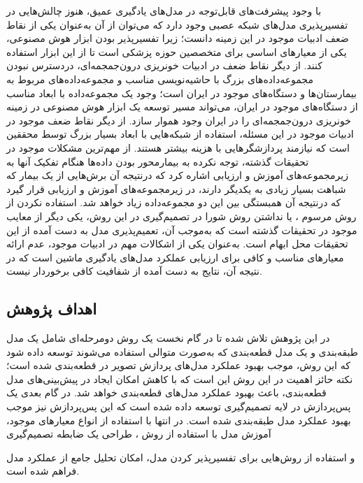  
 
 
 با وجود پیشرفت‌های قابل‌توجه در مدل‌های یادگیری عمیق، هنوز چالش‌هایی در تفسیرپذیری مدل‌های شبکه عصبی وجود دارد که می‌توان از آن به‌عنوان یکی از نقاط ضعف ادبیات موجود در این زمینه دانست؛ زیرا تفسیرپذیر بودن ابزار هوش مصنوعی، یکی از معیارهای اساسی برای متخصصین حوزه پزشکی است تا از این ابزار استفاده کنند. از دیگر نقاط ضعف در ادبیات خونریزی درون‌جمجمه‌ای، دردسترس نبودن مجموعه‌داده‌های بزرگ با حاشیه‌نویسی مناسب و مجموعه‌داده‌های مربوط به بیمارستان‌ها و دستگاه‌های موجود در ایران است؛ وجود یک مجموعه‌داده با ابعاد مناسب از دستگاه‌های موجود در ایران، می‌تواند مسیر توسعه یک ابزار هوش مصنوعی در زمینه خونریزی درون‌جمجمه‌ای را در ایران وجود هموار سازد. از دیگر نقاط ضعف موجود در ادبیات موجود در این مسئله، استفاده از شبکه‌هایی با ابعاد بسیار بزرگ توسط محققین است که نیازمند پردازشگر‌هایی با هزینه بیشتر هستند. از مهم‌ترین مشکلات موجود در تحقیقات گذشته، توجه نکرده به بیمارمحور بودن داده‌ها هنگام تفکیک آنها به زیرمجموعه‌های آموزش و ارزیابی اشاره کرد که درنتیجه‌ آن برش‌هایی از یک بیمار که شباهت بسیار زیادی به یکدیگر دارند، در زیرمجموعه‌های آموزش و ارزیابی قرار گیرد که درنتیجه آن همبستگی بین این دو مجموعه‌داده زیاد خواهد شد.
استفاده نکردن از روش مرسوم
، 
یا نداشتن روش شورا در تصمیم‌گیری در این روش، یکی دیگر از معایب موجود در تحقیقات گذشته است که به‌موجب آن، تعمیم‌پذیری مدل به دست آمده از این تحقیقات محل ابهام است.
به‌عنوان یکی از اشکالات مهم در ادبیات موجود، عدم ارائه معیارهای مناسب و کافی برای ارزیابی عملکرد مدل‌های یادگیری ماشین است که در نتیجه آن، نتایج به دست آمده از شفافیت کافی برخوردار نیست.
 \subsection{اهداف پژوهش}
 در این پژوهش تلاش شده تا در گام نخست یک روش دومرحله‌ای شامل یک مدل طبقه‌بندی و یک مدل قطعه‌بندی که به‌صورت متوالی استفاده می‌شوند توسعه داده شود که این روش،  موجب بهبود عملکرد مدل‌های پردازش تصویر در قطعه‌بندی شده است؛ نکته حائز اهمیت در این روش این است که با کاهش امکان ایجاد 
 در پیش‌بینی‌های مدل قطعه‌بندی، باعث بهبود عملکرد مدل‌های قطعه‌بندی خواهد شد.
  در گام بعدی یک پس‌پردازش
  در لایه تصمیم‌گیری توسعه داده شده است که این پس‌پردازش نیز موجب بهبود عملکرد مدل طبقه‌بندی شده است.
 در انتها با استفاده از انواع معیارهای موجود، آموزش مدل با استفاده از روش
 ،
  طراحی یک ضابطه تصمیم‌گیری
 
  و استفاده از روش‌هایی برای تفسیر‌پذیر کردن مدل، امکان تحلیل جامع از عملکرد مدل فراهم شده است.
